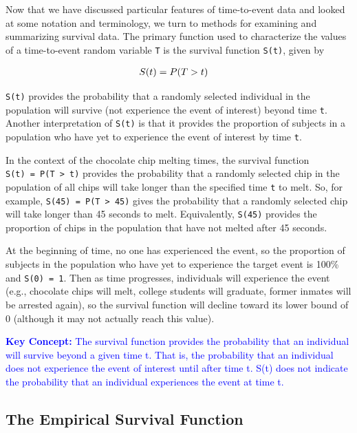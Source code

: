 \documentclass[
]{report}
\begin{document}
Now that we have discussed particular features of time-to-event data and looked at some notation and terminology, we turn to methods for examining and summarizing survival data. The primary function used to characterize the values of a time-to-event random variable \texttt{T} is the survival function \texttt{S(t)}, given by

\begin{align}
S(t) &= P(T > t)
\notag
\end{align}

\texttt{S(t)} provides the probability that a randomly selected individual in the population will survive (not experience the event of interest) beyond time \texttt{t}. Another interpretation of \texttt{S(t)} is that it provides the proportion of subjects in a population who have yet to experience the event of interest by time \texttt{t}.

In the context of the chocolate chip melting times, the survival function \texttt{S(t)\ =\ P(T\ \textgreater{}\ t)} provides the probability that a randomly selected chip in the population of all chips will take longer than the specified time \texttt{t} to melt. So, for example, \texttt{S(45)\ =\ P(T\ \textgreater{}\ 45)} gives the probability that a randomly selected chip will take longer than 45 seconds to melt. Equivalently, \texttt{S(45)} provides the proportion of chips in the population that have not melted after 45 seconds.

At the beginning of time, no one has experienced the event, so the proportion of subjects in the population who have yet to experience the target event is 100\% and \texttt{S(0)\ =\ 1}. Then as time progresses, individuals will experience the event (e.g., chocolate chips will melt, college students will graduate, former inmates will be arrested again), so the survival function will decline toward its lower bound of 0 (although it may not actually reach this value).

\textbf{\textcolor{blue}{Key Concept:}}
\textcolor{blue}{The survival function provides the probability that an individual will survive beyond a given time t. That is, the probability that an individual does not experience the event of interest until after time t. S(t) does not indicate the probability that an individual experiences the event at time t.}

\hypertarget{the-empirical-survival-function}{%
\subsection*{The Empirical Survival Function}\label{the-empirical-survival-function}}
\end{document}
